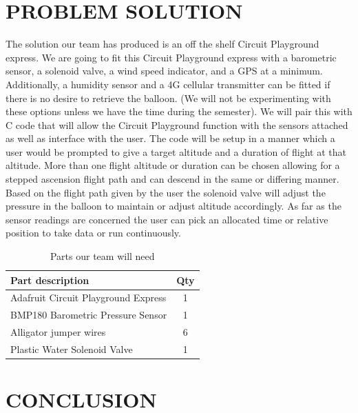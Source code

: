 \documentclass[12pt]{article}
\begin{document}
\section{PROBLEM SOLUTION}
The solution our team has produced is an off the shelf Circuit Playground express. We are going to fit this Circuit Playground express with a barometric sensor, a solenoid valve, a wind speed indicator, and a GPS at a minimum. Additionally, a humidity sensor and a 4G cellular transmitter can be fitted if there is no desire to retrieve the balloon. (We will not be experimenting with these options unless we have the time during the semester). We will pair this with C code that will allow the Circuit Playground function with the sensors attached as well as interface with the user. The code will be setup in a manner which a user would be prompted to give a target altitude and a duration of flight at that altitude. More than one flight altitude or duration can be chosen allowing for a stepped ascension flight path and can descend in the same or differing manner. Based on the flight path given by the user the solenoid valve will adjust the pressure in the balloon to maintain or adjust altitude accordingly. As far as the sensor readings are concerned the user can pick an allocated time or relative position to take data or run continuously.   



\begin{table}[ht]
  \caption{Parts our team will need}
  \label{table:parts_list}
  \begin{center}
  \begin{tabular}{|p{3in}|c|}
  
  \hline
  Part description & Qty\\
  \hline
  \hline
  Adafruit Circuit Playground Express & 1 \\
  \hline
  BMP180 Barometric Pressure Sensor & 1 \\
  \hline
  Alligator jumper wires & 6 \\
  \hline
  Plastic Water Solenoid Valve & 1 \\
  \hline
  \end{tabular}
  \end{center}
  \end{table}

\section{CONCLUSION}
\end{document}
